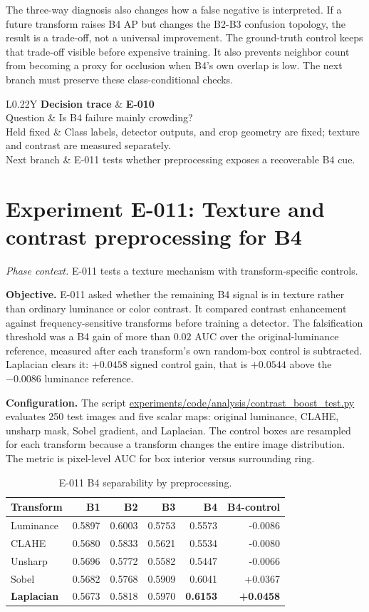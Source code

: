 \documentclass[preprint,12pt]{elsarticle}
\newcommand{\pathcode}[1]{\scriptsize\url{#1}}
\newcommand{\experiment}[2]{\par\medskip\Needspace{7\baselineskip}\section{Experiment #1: #2}}
\newcommand{\decisioncard}[4]{%
\begin{table}[H]\centering\small
\begin{tabularx}{\columnwidth}{L{0.22\columnwidth}Y}
\toprule
\textbf{Decision trace} & \textbf{#1}\\
Question & #2\\
Held fixed & #3\\
Next branch & #4\\
\bottomrule
\end{tabularx}
\end{table}}
\newcommand{\phasecontext}[1]{%
\par\smallskip\noindent\textit{Phase context.} #1\par\smallskip}
\begin{document}
The three-way diagnosis also changes how a false negative is interpreted. If a
future transform raises B4 AP but changes the B2-B3 confusion topology, the
result is a trade-off, not a universal improvement. The ground-truth control
keeps that trade-off visible before expensive training. It also prevents
neighbor count from becoming a proxy for occlusion when B4's own overlap is
low. The next branch must preserve these class-conditional checks.

\decisioncard{E-010}{Is B4 failure mainly crowding?}{Class labels, detector outputs, and crop geometry are fixed; texture and contrast are measured separately.}{E-011 tests whether preprocessing exposes a recoverable B4 cue.}
\experiment{E-011}{Texture and contrast preprocessing for B4}
\phasecontext{E-011 tests a texture mechanism with transform-specific controls.}
\textbf{Objective.} E-011 asked whether the remaining B4 signal is in texture
rather than ordinary luminance or color contrast. It compared contrast
enhancement against frequency-sensitive transforms before training a detector.
The falsification threshold was a B4 gain of more than \(0.02\) AUC over the
original-luminance reference, measured after each transform's own random-box
control is subtracted. Laplacian clears it: \(+0.0458\) signed control gain,
that is \(+0.0544\) above the \(-0.0086\) luminance reference.

\textbf{Configuration.} The script
\pathcode{experiments/code/analysis/contrast_boost_test.py} evaluates
250 test images and five scalar maps: original luminance, CLAHE, unsharp
mask, Sobel gradient, and Laplacian. The control boxes are resampled for each
transform because a transform changes the entire image distribution. The
metric is pixel-level AUC for box interior versus surrounding ring.

\begin{table}[H]
\centering
\caption{E-011 B4 separability by preprocessing.}
\label{tab:e011}
\begin{tabular}{lrrrrr}
\toprule
Transform & B1 & B2 & B3 & B4 & B4-control\\
\midrule
Luminance & 0.5897 & 0.6003 & 0.5753 & 0.5573 & -0.0086\\
CLAHE & 0.5680 & 0.5833 & 0.5621 & 0.5534 & -0.0080\\
Unsharp & 0.5696 & 0.5772 & 0.5582 & 0.5447 & -0.0066\\
Sobel & 0.5682 & 0.5768 & 0.5909 & 0.6041 & +0.0367\\
\textbf{Laplacian} & 0.5673 & 0.5818 & 0.5970 & \textbf{0.6153} & \textbf{+0.0458}\\
\bottomrule
\end{tabular}
\end{table}
\end{document}

